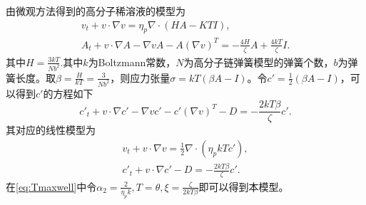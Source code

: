 	由微观方法得到的高分子稀溶液的模型为 \cite{le2009multiscale,larson1999structure}
	\begin{eqnarray*}
		v_t + v \cdot \nabla v = \eta_p \nabla \cdot (H A - KT I), \\
		A_t + v \cdot \nabla A - \nabla v A - A(\nabla v)^T  = -\frac{4 H}{\zeta} A+ \frac{4kT}{\zeta} I.
	\end{eqnarray*}
	其中$H = \frac{3kT}{Nb^2}$.其中$k$为Boltzmann常数，$N$为高分子链弹簧模型的弹簧个数，$b$为弹簧长度。取$\beta = \frac{H}{kT} = \frac{3}{Nb^2}$，则应力张量$\sigma = k T(\beta A-I)$。令$c'=\frac{1}{2}(\beta A-I)$，可以得到$c'$的方程如下
	\begin{equation}\label{eq:MicroUCM}
		c'_t + v \cdot \nabla c'- \nabla v c' - c'(\nabla v)^T -  D  = -\frac{2 kT \beta}{\zeta} c'.
	\end{equation}
	其对应的线性模型为
	\begin{eqnarray*}
		v_t + v \cdot \nabla v = \frac{1}{2} \nabla \cdot (\eta_p kT c'), \\
		c'_t + v \cdot \nabla c' -  D  = -\frac{2 kT \beta}{\zeta} c'.
	\end{eqnarray*}
	在\eqref{eq:Tmaxwell}中令$\alpha_2 = \frac{2}{\eta_p k}, T = \theta,\xi = \frac{\zeta}{2 kT \beta}$即可以得到本模型。

